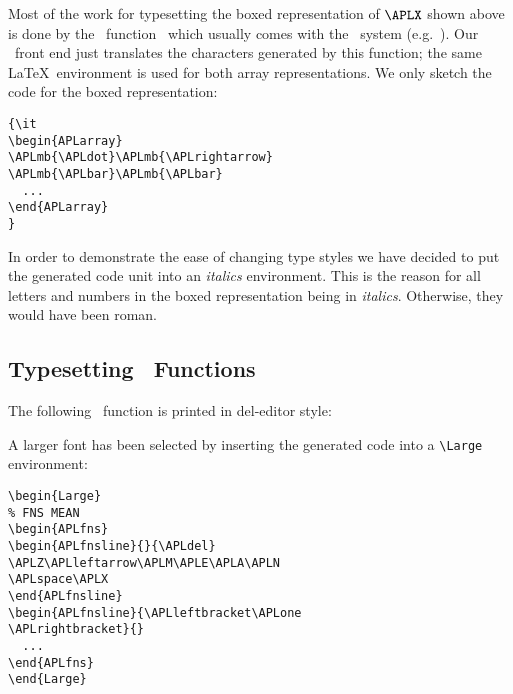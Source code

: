 Most of the work for typesetting the boxed representation of $\APLX$
shown above is done by the \APL\ function
\APLD\APLI\APLS\APLP\APLL\APLA\APLY\
which usually comes with the \APL\ system (e.g.\ \cite{IBM}).
Our \APL\ \TUBedit{9}front end just translates the
characters generated by this function;
the same \LaTeX\ environment is used for both array representations.
We only sketch the code for the boxed representation:
 
\begin{verbatim}
{\it
\begin{APLarray}
\APLmb{\APLdot}\APLmb{\APLrightarrow}
\APLmb{\APLbar}\APLmb{\APLbar}
  ...
\end{APLarray}
}
\end{verbatim}
 
In order to demonstrate the ease of changing type styles
we have decided to put the generated code unit into an
{\it italics} environment.
This is the reason for all letters and numbers in the
boxed representation being in {\it italics}.
Otherwise, they would have been roman.
 
\subsection{Typesetting \protect\bfAPL\ Functions}
 
The following \APL\ function is printed in
del-editor style:

 
% 
% 
\begin{Large}
\begin{APLfns}
\begin{APLfnsline}{}{\APLdel}
\APLZ\APLleftarrow\APLM\APLE\APLA\APLN\APLspace\APLX
\end{APLfnsline}
\begin{APLfnsline}{\APLleftbracket\APLone
\APLrightbracket}{}
\APLZ\APLleftarrow\APLleftparen\APLplus\APLslash\APLX
\APLrightparen\APLdivide\APLrho\APLX
\end{APLfnsline}
\begin{APLfnsline}{}{\APLdel}
\end{APLfnsline}
\end{APLfns}
\end{Large}

A larger font has been selected by inserting the generated code
into a \verb+\Large+ environment:
 
\begin{verbatim}
\begin{Large}
% FNS MEAN
\begin{APLfns}
\begin{APLfnsline}{}{\APLdel}
\APLZ\APLleftarrow\APLM\APLE\APLA\APLN
\APLspace\APLX
\end{APLfnsline}
\begin{APLfnsline}{\APLleftbracket\APLone
\APLrightbracket}{}
  ...
\end{APLfns}
\end{Large}
\end{verbatim}

